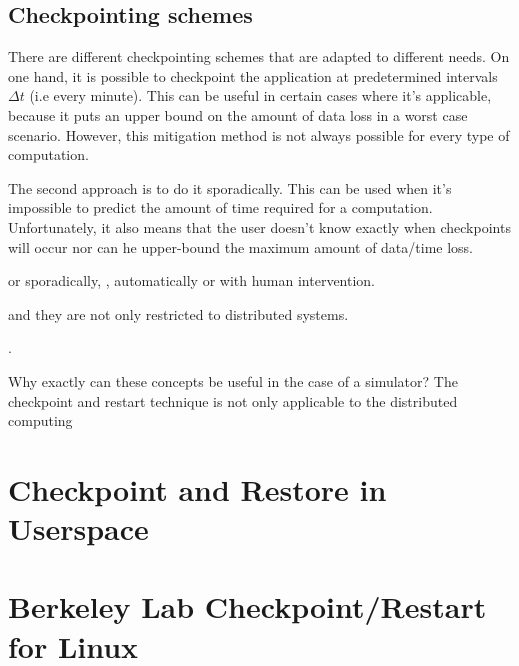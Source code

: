 {\subsection*{Checkpointing schemes}
There are different checkpointing schemes that are adapted to different needs. On one hand, it is possible to checkpoint the application at predetermined intervals $\Delta t$ (i.e every minute). This can be useful in certain cases where it's applicable, because it puts an upper bound on the amount of data loss in a worst case scenario. However, this mitigation method is not always possible for every type of computation. 

The second approach is to do it sporadically. This can be used when it's impossible to predict the amount of time required for a computation. Unfortunately, it also means that the user doesn't know exactly when checkpoints will occur nor can he upper-bound the maximum amount of data/time loss.

 or sporadically, , automatically or with human intervention.

 and they are not only restricted to distributed systems. 

.

Why exactly can these concepts be useful in the case of a simulator? The checkpoint and restart technique is not only applicable to the distributed computing 
  
\section{Checkpoint and Restore in Userspace}\label{sec:criu}
\section{Berkeley Lab Checkpoint/Restart for Linux}\label{sec:blcr}

}